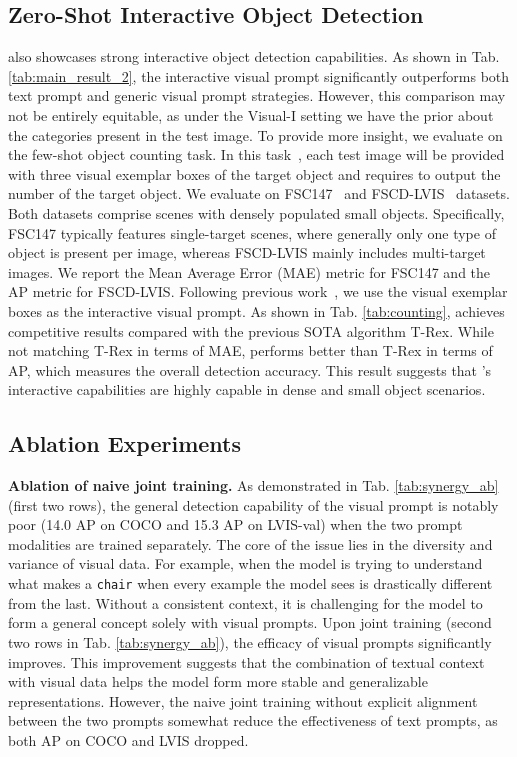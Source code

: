 \subsection{Zero-Shot Interactive Object Detection}
\ourmodel{} also showcases strong interactive object detection capabilities. As shown in Tab. \ref{tab:main_result_2}, the interactive visual prompt significantly outperforms both text prompt and generic visual prompt strategies. However, this comparison may not be entirely equitable, as under the Visual-I setting we have the prior about the categories present in the test image. To provide more insight, we evaluate \ourmodel{} on the few-shot object counting task. In this task~\cite{jiang2023t, nguyen2022few, shi2022represent, liu2022countr}, each test image will be provided with three visual exemplar boxes of the target object and requires to output the number of the target object. We evaluate on FSC147~\cite{ranjan2021learning} and FSCD-LVIS~\cite{nguyen2022few} datasets. Both datasets comprise scenes with densely populated small objects. Specifically, FSC147 typically features single-target scenes, where generally only one type of object is present per image, whereas FSCD-LVIS mainly includes multi-target images. We report the Mean Average Error (MAE) metric for FSC147 and the AP metric for FSCD-LVIS. Following previous work~\cite{jiang2023t}, we use the visual exemplar boxes as the interactive visual prompt. As shown in Tab. \ref{tab:counting}, \ourmodel{} achieves competitive results compared with the previous SOTA algorithm T-Rex. While not matching T-Rex in terms of MAE, \ourmodel{} performs better than T-Rex in terms of AP, which measures the overall detection accuracy. This result suggests that \ourmodel{}’s interactive capabilities are highly capable in dense and small object scenarios.

\subsection{Ablation Experiments}
\noindent\textbf{Ablation of naive joint training.} As demonstrated in Tab. \ref{tab:synergy_ab} (first two rows), the general detection capability of the visual prompt is notably poor (14.0 AP on COCO and 15.3 AP on LVIS-val) when the two prompt modalities are trained separately. The core of the issue lies in the diversity and variance of visual data. For example, when the model is trying to understand what makes a \texttt{chair} when every example the model sees is drastically different from the last. Without a consistent context, it is challenging for the model to form a general concept solely with visual prompts. Upon joint training (second two rows in Tab. \ref{tab:synergy_ab}), the efficacy of visual prompts significantly improves. This improvement suggests that the combination of textual context with visual data helps the model form more stable and generalizable representations. However, the naive joint training without explicit alignment between the two prompts somewhat reduce the effectiveness of text prompts, as both AP on COCO and LVIS dropped.


